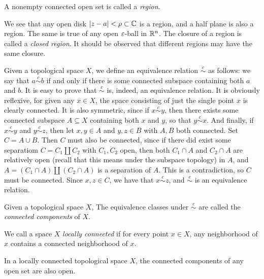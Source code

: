 \begin{definition}
	A nonempty connected open set is called a \emph{region}.
\end{definition}

We see that any open disk $\lvert z-a \rvert<\rho \subset \mathbb C$ is a region, and a half plane is also a region. The same is true of any open $\varepsilon$-ball in $\mathbb R^n$. The closure of a region is called a \emph{closed region}. It should be observed that different regions may have the same closure.

Given a topological space $X$, we define an equivalence relation $\overset{c}{\sim}$ as follows: we say that $a \overset{c}{\sim} b$ if and only if there is some connected subspace containing both $a$ and $b$. It is easy to prove that $\overset{c}{\sim}$ is, indeed, an equivalence relation. It is obviously reflexive, for given any $x \in X$, the space consisting of just the single point $x$ is clearly connected. It is also symmetric, since if $x \overset{c}{\sim} y$, then there exists some connected subspace $A \subseteq X$ containing both $x$ and $y$, so that $y \overset{c}{\sim} x$. And finally, if $x \overset{c}{\sim} y$ and $y \overset{c}{\sim} z$, then let $x,y \in A$ and $y,z \in B$ with $A,B$ both connected. Set $C=A \cup B$. Then $C$ must also be connected, since if there did exist some separatiom $C=C_1 \coprod C_2$ with $C_1,C_2$ open, then both $C_1 \cap A$ and $C_2 \cap A$ are relatively open (recall that this means under the subspace topology) in $A$, and $A=(C_1 \cap A) \coprod (C_2 \cap A)$ is a separation of $A$. This is a contradiction, so $C$ must be connected. Since $x,z \in C$, we have that $x \overset{c}{\sim} z$, and $\overset{c}{\sim}$ is an equivalence relation.

\begin{definition}
	Given a topological space $X$, The equivalence classes under $\overset{c}{\sim}$ are called the \emph{connected components} of $X$.
\end{definition}

\begin{definition}
	We call a space $X$ \emph{locally connected} if for every point $x \in X$, any neighborhood of $x$ contains a connected neighborhood of $x$.
\end{definition}

\begin{theorem}
	\label{thm: open-connected}
	In a locally connected topological space $X$, the connected components of any open set are also open.
\end{theorem}

